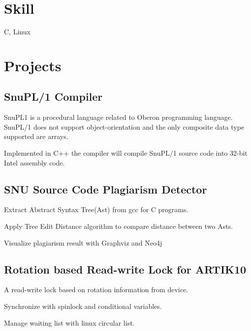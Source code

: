 \documentclass[letterpaper]{article}
\renewenvironment{itemize}{
  \begin{list}{}{
    \setlength{\leftmargin}{1.5em}
  }
}{
  \end{list}
}
\begin{document}
\section*{Skill}

\begin{itemize}
	\item C, Linux
\end{itemize}


\section*{Projects}

\subsection*{SnuPL/1 Compiler}
\begin{itemize}
\item SnuPL1 is a procedural language related to Oberon programming language. SnuPL/1 does not support object-orientation and the only composite data type supported are arrays.	
\item Implemented in C++ the compiler will compile SnuPL/1 source code into 32-bit Intel assembly code.	\\
\end{itemize}

\subsection*{SNU Source Code Plagiarism Detector}
\begin{itemize}
\item Extract Abstract Syntax Tree(Ast) from gcc for C programs.	
\item Apply Tree Edit Distance algorithm to compare distance between two Asts.	
\item Visualize plagiarism result with Graphviz and Neo4j	\\
\end{itemize}


\subsection*{Rotation based Read-write Lock for ARTIK10}
\begin{itemize}
\item A read-write lock based on rotation information from device.	
\item Synchronize with spinlock and conditional variables.	
\item Manage waiting list with linux circular list.	\\
\end{itemize}
\end{document}
